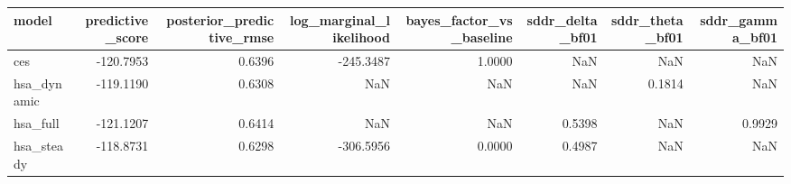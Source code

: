 \begin{tabular}{lrrrrrrr}
\toprule
model & predictive\_score & posterior\_predictive\_rmse & log\_marginal\_likelihood & bayes\_factor\_vs\_baseline & sddr\_delta\_bf01 & sddr\_theta\_bf01 & sddr\_gamma\_bf01 \\
\midrule
ces & -120.7953 & 0.6396 & -245.3487 & 1.0000 & NaN & NaN & NaN \\
hsa\_dynamic & -119.1190 & 0.6308 & NaN & NaN & NaN & 0.1814 & NaN \\
hsa\_full & -121.1207 & 0.6414 & NaN & NaN & 0.5398 & NaN & 0.9929 \\
hsa\_steady & -118.8731 & 0.6298 & -306.5956 & 0.0000 & 0.4987 & NaN & NaN \\
\bottomrule
\end{tabular}
